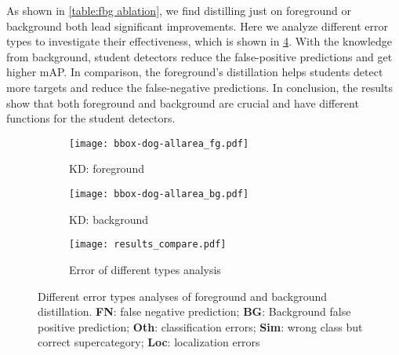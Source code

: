 \documentclass[10pt,twocolumn,letterpaper]{article}
\begin{document}
 As shown in \cref{table:fbg ablation}, we find distilling just on foreground or background both lead significant improvements. Here we analyze different error types to investigate their effectiveness, which is shown in \cref{figure:fbg_error}. With the knowledge from background, student detectors reduce the false-positive predictions and get higher mAP. In comparison, the foreground's distillation helps students detect more targets and reduce the false-negative predictions. In conclusion, the results show that both foreground and background are crucial and have different functions for the student detectors. 

\begin{figure}
  \centering
  \begin{subfigure}{0.495\linewidth}
    \texttt{[image: bbox-dog-allarea\_fg.pdf]}
    \caption{KD: foreground}
    \label{fig:fg}
  \end{subfigure}
  \hfill
  \begin{subfigure}{0.495\linewidth}
    \texttt{[image: bbox-dog-allarea\_bg.pdf]}
    \caption{KD: background}
    \label{fig:bg}
  \end{subfigure}
  \hfill
  \begin{subfigure}{0.7\linewidth}
    \texttt{[image: results\_compare.pdf]}
    \caption{Error of different types analysis}
    \label{fig:fbg_com}
  \end{subfigure}
  \caption{Different error types analyses of foreground and background distillation. {\bf FN}: false negative prediction; {\bf BG}: Background false positive prediction; {\bf Oth}: classification errors; {\bf Sim}: wrong class but correct supercategory; {\bf Loc}: localization errors}
  \label{figure:fbg_error}
\end{figure}
\end{document}
